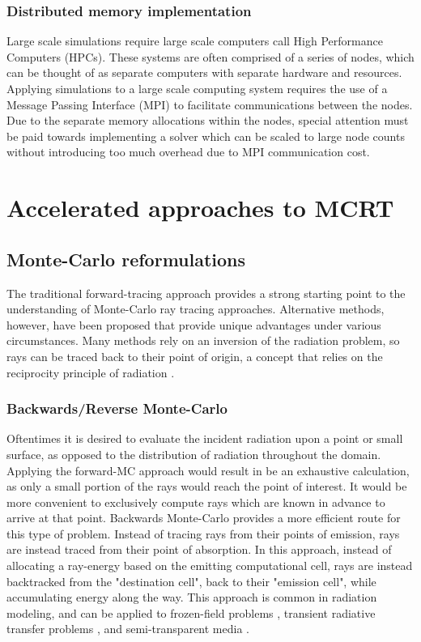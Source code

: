 \subsubsection{Distributed memory implementation}
Large scale simulations require large scale computers call High Performance Computers (HPCs). These systems are often comprised of a series of nodes, which can be thought of as separate computers with separate hardware and resources.
Applying simulations to a large scale computing system requires the use of a Message Passing Interface (MPI) to facilitate communications between the nodes.
Due to the separate memory allocations within the nodes, special attention must be paid towards implementing a solver which can be scaled to large node counts without introducing too much overhead due to MPI communication cost.
 


\section{Accelerated approaches to MCRT}

\subsection{Monte-Carlo reformulations}
The traditional forward-tracing approach provides a strong starting point to the understanding of Monte-Carlo ray tracing approaches. Alternative methods, however, have been proposed that provide unique advantages under various circumstances.
Many methods rely on an inversion of the radiation problem, so rays can be traced back to their point of origin, a concept that relies on the reciprocity principle of radiation \cite{Case1957TransferPrinciple}.

\subsubsection{Backwards/Reverse Monte-Carlo}
Oftentimes it is desired to evaluate the incident radiation upon a point or small surface, as opposed to the distribution of radiation throughout the domain.
Applying the forward-MC approach would result in be an exhaustive calculation, as only a small portion of the rays would reach the point of interest. It would be more convenient to exclusively compute rays which are known in advance to arrive at that point. 
Backwards Monte-Carlo provides a more efficient route for this type of problem.
Instead of tracing rays from their points of emission, rays are instead traced from their point of absorption.
In this approach, instead of allocating a ray-energy based on the emitting computational cell, rays are instead backtracked from the "destination cell", back to their "emission cell", while accumulating energy along the way.
This approach is common in radiation modeling, and can be applied to frozen-field problems \cite{}, transient radiative transfer problems \cite{Lu2004ReverseMedia}, and semi-transparent media \cite{Li2005BackwardSlab}.

